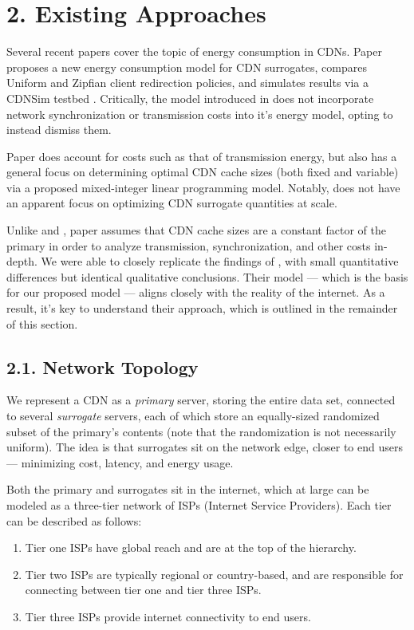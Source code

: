\documentclass[
	a4paper, %
	10pt, %
	unnumberedsections, %
	twoside, %
]{LTJournalArticle}
\begin{document}
\section{2. Existing Approaches}

Several recent papers cover the topic of energy consumption in CDNs. Paper \cite{ulIslam2012} proposes a new energy consumption model for CDN surrogates, compares Uniform and Zipfian client redirection policies, and simulates results via a CDNSim testbed \cite{cdnsim}. Critically, the model introduced in \cite{ulIslam2012} does not incorporate network synchronization or transmission costs into it's energy model, opting to instead dismiss them. 

Paper \cite{osmanthesis} does account for costs such as that of transmission energy, but also has a general focus on determining optimal CDN cache sizes (both fixed and variable) via a proposed mixed-integer linear programming model. Notably, \cite{osmanthesis} does not have an apparent focus on optimizing CDN surrogate quantities at scale.

Unlike \cite{osmanthesis} and \cite{ulIslam2012}, paper \cite{biancoCDNs2017} assumes that CDN cache sizes are a constant factor of the primary in order to analyze transmission, synchronization, and other costs in-depth. We were able to closely replicate the findings of \cite{biancoCDNs2017}, with small quantitative differences but identical qualitative conclusions. Their model — which is the basis for our proposed model — aligns closely with the reality of the internet. As a result, it's key to understand their approach, which is outlined in the remainder of this section.

\subsection{2.1. Network Topology}

We represent a CDN as a \textit{primary} server, storing the entire data set, connected to several \textit{surrogate} servers, each of which store an equally-sized randomized subset of the primary's contents (note that the randomization is not necessarily uniform). The idea is that surrogates sit on the network edge, closer to end users — minimizing cost, latency, and energy usage. 

Both the primary and surrogates sit in the internet, which at large can be modeled as a three-tier network of ISPs (Internet Service Providers). Each tier can be described as follows:
\begin{enumerate}
    \item Tier one ISPs have global reach and are at the top of the hierarchy.
    \item Tier two ISPs are typically regional or country-based, and are responsible for connecting between tier one and tier three ISPs.
    \item Tier three ISPs provide internet connectivity to end users.
\end{enumerate}
\end{document}
